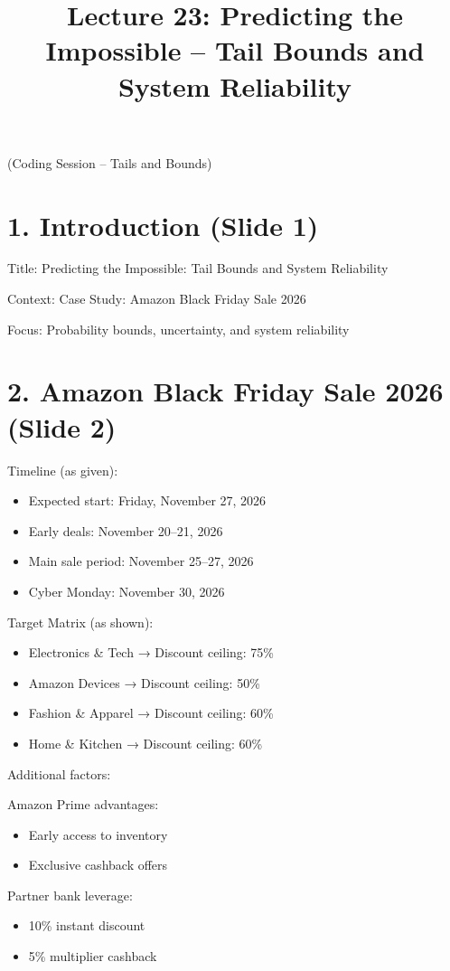 \documentclass[12pt]{article}
\begin{document}
\title{Lecture 23: Predicting the Impossible – Tail Bounds and System Reliability}
\date{}
\maketitle

(Coding Session – Tails and Bounds)

\section*{1. Introduction (Slide 1)}
Title: Predicting the Impossible: Tail Bounds and System Reliability

Context: Case Study: Amazon Black Friday Sale 2026

Focus: Probability bounds, uncertainty, and system reliability

\section*{2. Amazon Black Friday Sale 2026 (Slide 2)}

Timeline (as given):
\begin{itemize}
\item Expected start: Friday, November 27, 2026
\item Early deals: November 20–21, 2026
\item Main sale period: November 25–27, 2026
\item Cyber Monday: November 30, 2026
\end{itemize}

Target Matrix (as shown):
\begin{itemize}
\item Electronics \& Tech → Discount ceiling: 75\%
\item Amazon Devices → Discount ceiling: 50\%
\item Fashion \& Apparel → Discount ceiling: 60\%
\item Home \& Kitchen → Discount ceiling: 60\%
\end{itemize}

Additional factors:

Amazon Prime advantages:
\begin{itemize}
\item Early access to inventory
\item Exclusive cashback offers
\end{itemize}

Partner bank leverage:
\begin{itemize}
\item 10\% instant discount
\item 5\% multiplier cashback
\end{itemize}
\end{document}

